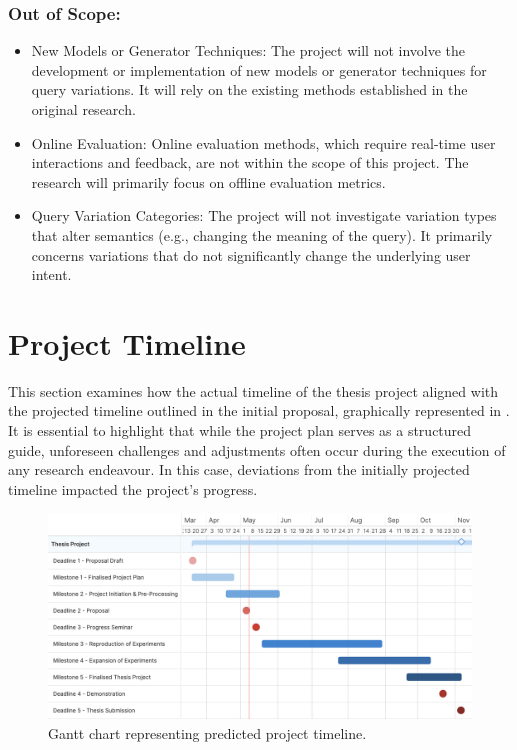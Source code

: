 \subsubsection{Out of Scope:}
\begin{itemize}
    \item New Models or Generator Techniques: The project will not involve the development or implementation of new models or generator techniques for query variations. It will rely on the existing methods established in the original research.
    \item Online Evaluation: Online evaluation methods, which require real-time user interactions and feedback, are not within the scope of this project. The research will primarily focus on offline evaluation metrics.
    \item Query Variation Categories: The project will not investigate variation types that alter semantics (e.g., changing the meaning of the query). It primarily concerns variations that do not significantly change the underlying user intent.
\end{itemize}

\section{Project Timeline}
This section examines how the actual timeline of the thesis project aligned with the projected timeline outlined in the initial proposal, graphically represented in . It is essential to highlight that while the project plan serves as a structured guide, unforeseen challenges and adjustments often occur during the execution of any research endeavour. In this case, deviations from the initially projected timeline impacted the project's progress.

\begin{figure}[h]
    \centering
    \includegraphics[width=\textwidth]{1Introduction/GanttChart.png}
    \caption{Gantt chart representing predicted project timeline.}
    \label{fig:gantt}
\end{figure}

